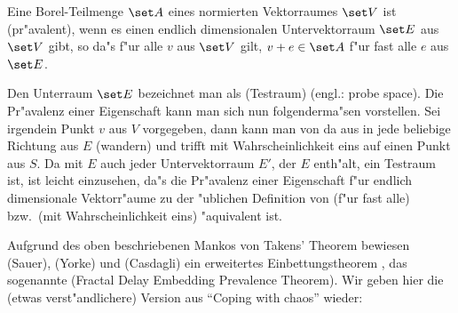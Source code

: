 \begin{definition}
Eine Borel-Teilmenge $\set A$ eines normierten Vektorraumes $\set V$ ist \begriff(pr"avalent), wenn
es einen endlich dimensionalen Untervektorraum $\set E$ aus $\set V$ gibt, so da"s f"ur alle $v$ aus
$\set V$ gilt, $v+e\in \set A$ f"ur fast alle $e$ aus $\set E$.
\end{definition}
Den Unterraum $\set E$ bezeichnet man als \begriff(Testraum) (engl.: probe space). Die Pr"avalenz
einer Eigenschaft  kann man sich nun folgenderma"sen vorstellen. Sei irgendein
Punkt $v$ aus $V$ vorgegeben, dann kann man von da aus in jede beliebige Richtung aus $E$
\naja(wandern) und trifft mit Wahrscheinlichkeit eins auf einen Punkt aus $S$. Da mit $E$
auch jeder Untervektorraum $E'$, der $E$ enth"alt, ein Testraum ist, ist leicht
einzusehen, da"s die Pr"avalenz einer Eigenschaft f"ur endlich dimensionale Vektorr"aume zu
der "ublichen Definition von \naja(f"ur fast alle) bzw.\ \naja(mit Wahrscheinlichkeit
eins) "aquivalent ist.


Aufgrund des oben beschriebenen Mankos von Takens' Theorem bewiesen \autor(Sauer),
\autor(Yorke) und \autor(Casdagli) ein erweitertes Einbettungstheorem \cite{Sauer91}, das
sogenannte \begriff(Fractal Delay Embedding Prevalence Theorem). Wir geben hier die (etwas 
verst"andlichere) Version aus ``Coping with chaos'' \cite{Ott94} wieder:

